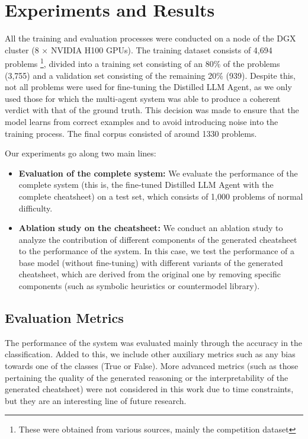 \documentclass{article}
\begin{document}
\section{Experiments and Results}
All the training and evaluation processes were conducted on a node of the DGX cluster (8 $\times$ NVIDIA H100 GPUs). The training dataset consists of 4,694 problems \footnote{These were obtained from various sources, mainly the competition dataset}, divided into a training set consisting of an 80\% of the problems (3,755) and a validation set consisting of the remaining 20\% (939). Despite this, not all problems were used for fine-tuning the Distilled LLM Agent, as we only used those for which the multi-agent system was able to produce a coherent verdict with that of the ground truth. This decision was made to ensure that the model learns from correct examples and to avoid introducing noise into the training process. The final corpus consisted of around 1330 problems.

Our experiments go along two main lines:
\begin{itemize}
  \item \textbf{Evaluation of the complete system:} We evaluate the performance of the complete system (this is, the fine-tuned Distilled LLM Agent with the complete cheatsheet) on a test set, which consists of 1,000 problems of normal difficulty.
  \item \textbf{Ablation study on the cheatsheet:} We conduct an ablation study to analyze the contribution of different components of the generated cheatsheet to the performance of the system. In this case, we test the performance of a base model (without fine-tuning) with different variants of the generated cheatsheet, which are derived from the original one by removing specific components (such as symbolic heuristics or countermodel library).
\end{itemize}

\subsection{Evaluation Metrics}

The performance of the system was evaluated mainly through the accuracy in the classification. Added to this, we include other auxiliary metrics such as any bias towards one of the classes (True or False). More advanced metrics (such as those pertaining the quality of the generated reasoning or the interpretability of the generated cheatsheet) were not considered in this work due to time constraints, but they are an interesting line of future research.
\end{document}
